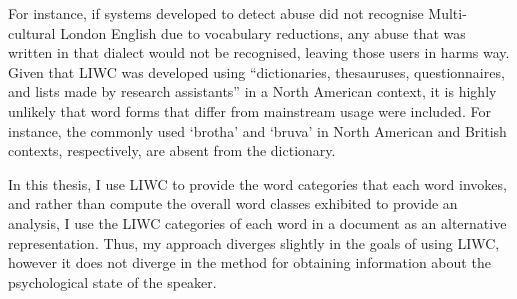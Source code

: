 For instance, if systems developed to detect abuse did not recognise Multi-cultural London English due to vocabulary reductions, any abuse that was written in that dialect would not be recognised, leaving those users in harms way.  
Given that LIWC was developed using ``dictionaries, thesauruses, questionnaires, and lists made by research assistants'' \citep{Tausczik:2010} in a North American context, it is highly unlikely that word forms that differ from mainstream usage were included.  
For instance, the commonly used `brotha' and `bruva' in North American and British contexts, respectively, are absent from the dictionary.  
\vspace{5mm}  
  
In this thesis, I use LIWC to provide the word categories that each word invokes, and rather than compute the overall word classes exhibited to provide an analysis, I use the LIWC categories of each word in a document as an alternative  representation.  
Thus, my approach diverges slightly in the goals of using LIWC, however it does not diverge in the method for obtaining information about the psychological state of the speaker.  
  
